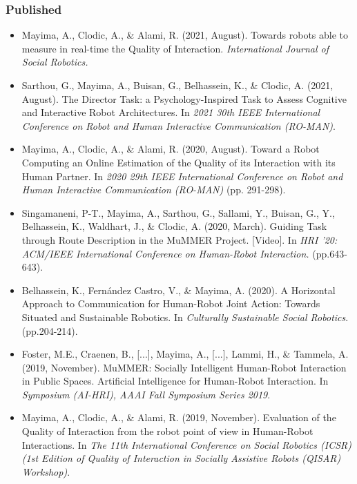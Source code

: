 \documentclass[a4paper,11pt,twoside]{StyleThese}
\begin{document}
\subsubsection*{Published}
\begin{itemize}
\item Mayima, A., Clodic, A., \& Alami, R. (2021, August). Towards robots able to measure in real-time the Quality of Interaction. \textit{International Journal of Social Robotics.} 

\item Sarthou, G., Mayima, A., Buisan, G., Belhassein, K., \& Clodic, A. (2021, August). The Director Task: a Psychology-Inspired Task to Assess Cognitive and Interactive Robot Architectures. In \textit{2021 30th IEEE International Conference on Robot and Human Interactive Communication (RO-MAN)}.

\item  Mayima, A., Clodic, A., \& Alami, R. (2020, August). Toward a Robot Computing an Online Estimation of the Quality of its Interaction with its Human Partner. In \textit{2020 29th IEEE International Conference on Robot and Human Interactive Communication (RO-MAN)} (pp. 291-298).

\item Singamaneni, P-T., Mayima, A., Sarthou, G., Sallami, Y., Buisan, G., Y., Belhassein, K., Waldhart, J., \& Clodic, A. (2020, March). Guiding Task through Route Description in the MuMMER Project. [Video]. In \textit{HRI '20: ACM/IEEE International Conference on Human-Robot Interaction.} (pp.643-643).

\item Belhassein, K., Fernández Castro, V., \& Mayima, A. (2020). A Horizontal Approach to Communication for Human-Robot Joint Action: Towards Situated and Sustainable Robotics. In \textit{Culturally Sustainable Social Robotics}. (pp.204-214).

\item Foster, M.E., Craenen, B., [...], Mayima, A., [...], Lammi, H., \& Tammela, A. (2019, November). MuMMER: Socially Intelligent Human-Robot Interaction in Public Spaces. Artificial Intelligence for Human-Robot Interaction. In \textit{Symposium (AI-HRI), AAAI Fall Symposium Series 2019}.

\item  Mayima, A., Clodic, A., \& Alami, R. (2019, November). Evaluation of the Quality of Interaction from the robot point of view in Human-Robot Interactions. In \textit{ The 11th International Conference on Social Robotics (ICSR) (1st Edition of Quality of Interaction in Socially Assistive Robots (QISAR) Workshop)}.
\end{itemize}
\end{document}
